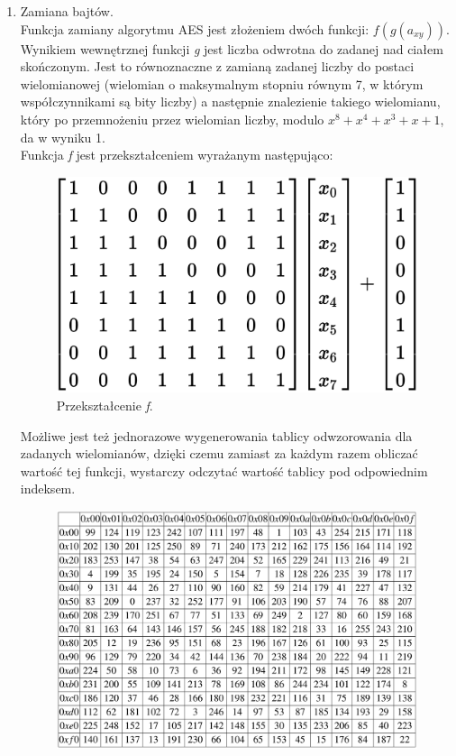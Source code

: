 \begin{enumerate}
	\item Zamiana bajtów. \\
			Funkcja zamiany algorytmu AES jest złożeniem dwóch funkcji: $f(g(a_{xy})).$ \\
			Wynikiem wewnętrznej funkcji \textit{g} jest liczba odwrotna do zadanej nad ciałem skończonym.
			Jest to równoznaczne z zamianą zadanej liczby do postaci wielomianowej (wielomian o maksymalnym 
			stopniu równym 7, w którym współczynnikami są bity liczby) a następnie znalezienie takiego
			wielomianu, który po przemnożeniu przez wielomian liczby, modulo $x^8+x^4+x^3+x+1$, da w wyniku 1. \\
			Funkcja \textit{f} jest przekształceniem wyrażanym następująco: \\
			\begin{figure}[t]
			    \centering
			    \includegraphics[scale=0.5]{content/images/affin}
				\caption{Przekształcenie \textit{f}.}
			\end{figure}
			Możliwe jest też jednorazowe wygenerowania tablicy odwzorowania dla zadanych wielomianów,
			dzięki czemu zamiast za każdym razem obliczać wartość tej funkcji, wystarczy odczytać wartość tablicy
			pod odpowiednim indeksem. 
			\begin{figure}[t]
			    \centering
			    \includegraphics[width=\textwidth]{content/images/sbox}

\end{figure}
\end{enumerate}
